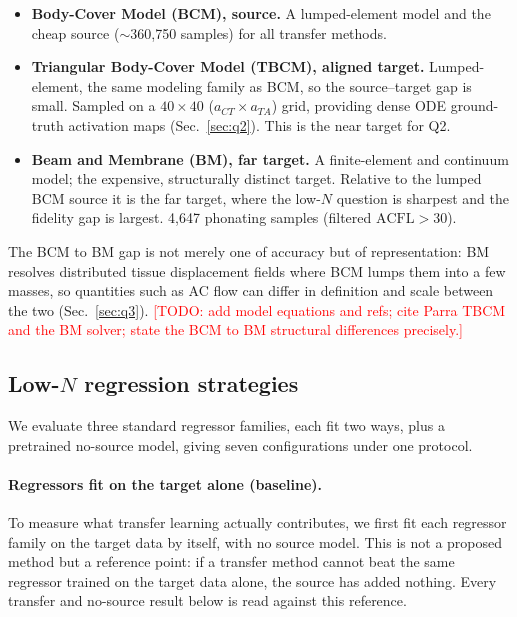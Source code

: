 \documentclass[11pt]{article}
\newcommand{\todo}[1]{\textcolor{red}{[TODO: #1]}}
\begin{document}
\begin{itemize}
  \item \textbf{Body-Cover Model (BCM), source.} A lumped-element model and the
  cheap source ($\sim$360,750 samples) for all transfer methods.
  \item \textbf{Triangular Body-Cover Model (TBCM), aligned target.}
  Lumped-element, the same modeling family as BCM, so the source--target gap is
  small. Sampled on a $40 \times 40$ ($a_{CT} \times a_{TA}$) grid, providing
  dense ODE ground-truth activation maps (Sec.~\ref{sec:q2}). This is the near
  target for Q2.
  \item \textbf{Beam and Membrane (BM), far target.} A finite-element and
  continuum model; the expensive, structurally distinct target. Relative to the
  lumped BCM source it is the far target, where the low-$N$ question is sharpest
  and the fidelity gap is largest. 4,647 phonating samples (filtered
  $\mathrm{ACFL} > 30$).
\end{itemize}

The BCM to BM gap is not merely one of accuracy but of representation: BM
resolves distributed tissue displacement fields where BCM lumps them into a few
masses, so quantities such as AC flow can differ in definition and scale between
the two (Sec.~\ref{sec:q3}). \todo{add model equations and refs; cite Parra TBCM
and the BM solver; state the BCM to BM structural differences precisely.}

\subsection{Low-$N$ regression strategies}

We evaluate three standard regressor families, each fit two ways, plus a
pretrained no-source model, giving seven configurations under one protocol.

\paragraph{Regressors fit on the target alone (baseline).}
To measure what transfer learning actually contributes, we first fit each
regressor family on the target data by itself, with no source model. This is not
a proposed method but a reference point: if a transfer method cannot beat the
same regressor trained on the target data alone, the source has added nothing.
Every transfer and no-source result below is read against this reference.
\end{document}
